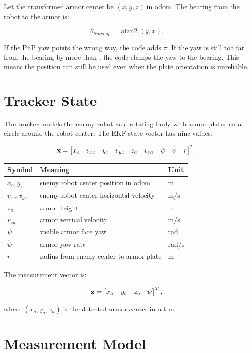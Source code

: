 Let the transformed armor center be $(x,y,z)$ in odom. The bearing from the
robot to the armor is:

\[
\theta_{bearing} = \operatorname{atan2}(y,x).
\]

If the PnP yaw points the wrong way, the code adds $\pi$. If the yaw is still
too far from the bearing by more than , the code clamps
the yaw to the bearing. This means the position can still be used even when the
plate orientation is unreliable.

\section{Tracker State}

The tracker models the enemy robot as a rotating body with armor plates on a
circle around the robot center. The EKF state vector has nine values:

\[
\mathbf{x} =
\begin{bmatrix}
x_c & v_{xc} & y_c & v_{yc} & z_a & v_{za} & \psi & \dot{\psi} & r
\end{bmatrix}^T.
\]

\begin{longtable}{p{}p{}p{}}
\toprule
Symbol & Meaning & Unit \\
\midrule
$x_c,y_c$ & enemy robot center position in odom & m \\
$v_{xc},v_{yc}$ & enemy robot center horizontal velocity & m/s \\
$z_a$ & armor height & m \\
$v_{za}$ & armor vertical velocity & m/s \\
$\psi$ & visible armor face yaw & rad \\
$\dot{\psi}$ & armor yaw rate & rad/s \\
$r$ & radius from enemy center to armor plate & m \\
\bottomrule
\end{longtable}

The measurement vector is:

\[
\mathbf{z} =
\begin{bmatrix}
x_a & y_a & z_a & \psi
\end{bmatrix}^T,
\]

where $(x_a,y_a,z_a)$ is the detected armor center in odom.

\section{Measurement Model}

